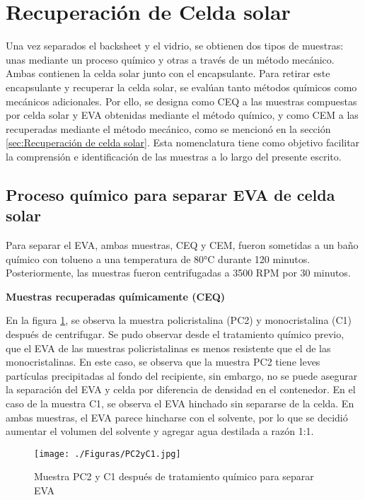 \section{Recuperación de Celda solar}
\label{sec:Resultados recuperación de celda}
 
Una vez separados el backsheet y el vidrio, se obtienen dos tipos de muestras: unas mediante un proceso químico y otras a través de un método mecánico. Ambas contienen la celda solar junto con el encapsulante. Para retirar este encapsulante y recuperar la celda solar, se evalúan tanto métodos químicos como mecánicos adicionales. Por ello, se designa como CEQ a las muestras compuestas por celda solar y EVA obtenidas mediante el método químico, y como CEM a las recuperadas mediante el método mecánico, como se mencionó en la sección \ref{sec:Recuperación de celda solar}. Esta nomenclatura tiene como objetivo facilitar la comprensión e identificación de las muestras a lo largo del presente escrito.
 
 
\subsection{Proceso químico para separar EVA de celda solar}
\label{subsec:Resultados metodo quimico celda}

Para separar el EVA, ambas muestras, CEQ y CEM, fueron sometidas a un baño químico con tolueno a una temperatura de 80°C durante 120 minutos. Posteriormente, las muestras fueron centrifugadas a 3500 RPM por 30 minutos. 

\textbf{Muestras recuperadas químicamente (CEQ)}

En la figura \ref{fig:MuestrasPC2yC1}, se observa la muestra policristalina (PC2) y monocristalina (C1) después de centrifugar. Se pudo observar desde el tratamiento químico previo, que el EVA de las muestras policristalinas es menos resistente que el de las monocristalinas. En este caso, se observa que la muestra PC2 tiene leves partículas precipitadas al fondo del recipiente, sin embargo, no se puede asegurar la separación del EVA y celda por diferencia de densidad en el contenedor. En el caso de la muestra C1, se observa el EVA hinchado sin separarse de la celda. 
En ambas muestras, el EVA parece hincharse con el solvente, por lo que se decidió aumentar el volumen del solvente y agregar agua destilada a razón 1:1. 
 

\begin{figure}[htb]
	\begin{center}
		\texttt{[image: ./Figuras/PC2yC1.jpg]}
	\end{center}
	\vspace{-1em} %
	\caption{Muestra PC2 y C1 después de tratamiento químico para separar EVA}
	\label{fig:MuestrasPC2yC1}
\end{figure}

